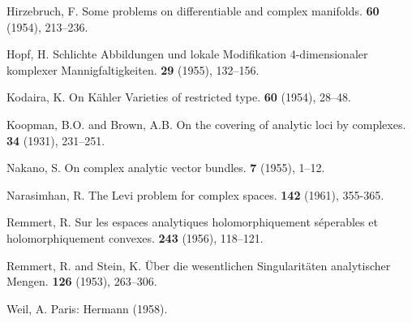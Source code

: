\documentclass{article}
\theoremstyle{plain}
\begin{document}
\begin{thebibliography}{20}
  {Hirzebruch, F.}
  \newblock Some problems on differentiable and complex manifolds.
   {\bf 60} (1954), 213--236.

  {Hopf, H.}
  \newblock Schlichte Abbildungen und lokale Modifikation 4-dimensionaler komplexer Mannigfaltigkeiten.
   {\bf 29} (1955), 132--156.

  {Kodaira, K.}
  \newblock On K\"{a}hler Varieties of restricted type.
   {\bf 60} (1954), 28--48.

  {Koopman, B.O. and Brown, A.B.}
  \newblock On the covering of analytic loci by complexes.
   {\bf 34} (1931), 231--251.

  {Nakano, S.}
  \newblock On complex analytic vector bundles.
   {\bf 7} (1955), 1--12.

  {Narasimhan, R.}
  \newblock The Levi problem for complex spaces.
   {\bf 142} (1961), 355-365.

  {Remmert, R.}
  \newblock Sur les espaces analytiques holomorphiquement s\'{e}perables et holomorphiquement convexes.
   {\bf 243} (1956), 118--121.

  {Remmert, R. and Stein, K.}
  \newblock \"{U}ber die wesentlichen Singularit\"{a}ten analytischer Mengen.
   {\bf 126} (1953), 263--306.

  {Weil, A.}
  \newblock Paris: Hermann (1958).

\end{thebibliography}
\end{document}
